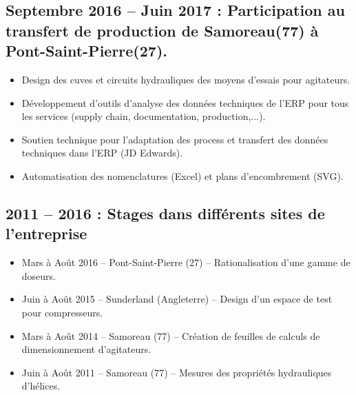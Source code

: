 \documentclass[10pt,a4paper,sans]{article}
\begin{document}
\begin{minipage}[t]{0.68\textwidth}
    \subsection{Septembre 2016 -- Juin 2017 : Participation au transfert de production de Samoreau(77) à Pont-Saint-Pierre(27).}
    \begin{itemize}
        \item{Design des cuves et circuits hydrauliques des moyens d’essais pour agitateurs.}
        \item{Développement d’outils d’analyse des données techniques de l’ERP pour tous les services (supply chain, documentation, production,...).}
        \item{Soutien technique pour l’adaptation des process et transfert des données techniques dans l’ERP (JD Edwards).}
        \item{Automatisation des nomenclatures (Excel) et plans d’encombrement (SVG).}
    \end{itemize}


    \subsection{2011 -- 2016 : Stages dans différents sites de l'entreprise}
    \begin{itemize}
        \item{Mars à Août 2016 -- Pont-Saint-Pierre (27) -- Rationalisation d’une gamme de doseurs.}
        \item{Juin à Août 2015 -- Sunderland (Angleterre) -- Design d’un espace de test pour compresseurs.}
        \item{Mars à Août 2014 -- Samoreau (77) -- Création de feuilles de calculs de dimensionnement d’agitateurs.}
        \item{Juin à Août 2011 -- Samoreau (77) -- Mesures des propriétés hydrauliques d’hélices.}
    \end{itemize}
\end{minipage}
\end{document}

